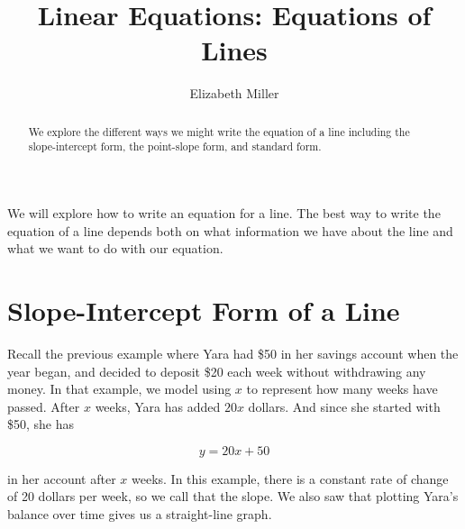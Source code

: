 \documentclass[nooutcomes]{ximera}
\author{Elizabeth Miller}
\title{Linear Equations: Equations of Lines}
\begin{document}
\begin{abstract}
  We explore the different ways we might write the equation of a line including the slope-intercept form, the point-slope form, and standard form.
\end{abstract}
\newcommand{\dfn}[1]{#1}
\maketitle
We will explore how to write an equation for a line.  The best way to write the equation of a line depends both on what information we have about the line and what we want to do with our equation.  


\section{Slope-Intercept Form of a Line}

Recall the previous example where Yara had \$50 in her savings account when the year began, and decided to deposit \$20 each week without withdrawing any money. In that example, we model using $x$ to represent how many weeks have passed. After $x$  weeks, Yara has added $20x$ dollars. And since she started with \$50,  she has

$$y=20x+50$$ 

in her account after $x$ weeks. In this example, there is a constant rate of change of 20 dollars per week, so we call that the slope. We also saw that plotting Yara's balance over time gives us a straight-line graph.




\end{document}
